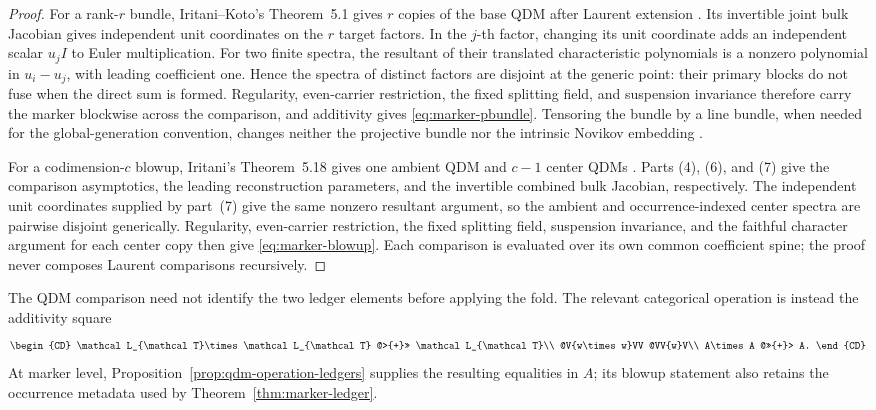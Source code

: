 \begin{proof}
For a rank-\(r\) bundle, Iritani--Koto's Theorem~5.1 gives \(r\) copies of
the base QDM after Laurent extension \cite[Theorem~5.1]{IritaniKoto}.  Its
invertible joint bulk Jacobian gives independent unit coordinates on the
\(r\) target factors.  In the \(j\)-th factor, changing its unit coordinate
adds an independent scalar \(u_jI\) to Euler multiplication.  For two finite
spectra, the resultant of their translated characteristic polynomials is a
nonzero polynomial in \(u_i-u_j\), with leading coefficient one.  Hence the
spectra of distinct factors are disjoint at the generic point: their primary
blocks do not fuse when the direct sum is formed.  Regularity, even-carrier
restriction, the fixed splitting field, and suspension invariance therefore carry the marker
blockwise across the comparison, and additivity gives
\eqref{eq:marker-pbundle}.  Tensoring the bundle by a line bundle, when needed
for the global-generation convention, changes neither the projective bundle
nor the intrinsic Novikov embedding
\cite[Remark~1.2 and Remark~5.2]{IritaniKoto}.

For a codimension-\(c\) blowup, Iritani's Theorem~5.18 gives one ambient QDM
and \(c-1\) center QDMs \cite[Theorem~5.18]{IritaniBlowup}.  Parts (4), (6),
and (7) give the comparison asymptotics, the leading reconstruction
parameters, and the invertible combined bulk Jacobian, respectively.  The
independent unit coordinates supplied by part~(7) give the same nonzero
resultant argument, so the ambient and occurrence-indexed center spectra are
pairwise disjoint generically.  Regularity, even-carrier restriction, the
fixed splitting field, suspension invariance, and the faithful character
argument for each center copy then give
\eqref{eq:marker-blowup}.  Each comparison is evaluated over its own common
coefficient spine; the proof never composes Laurent comparisons recursively.
\end{proof}

The QDM comparison need not identify the two ledger elements before applying
the fold.  The relevant categorical operation is instead the additivity square
\begin{equation}
\begin{CD}
 \mathcal L_{\mathcal T}\times\mathcal L_{\mathcal T}
 @>{+}>> \mathcal L_{\mathcal T}\\
 @V{w\times w}VV @VV{w}V\\
 A\times A @>>{+}> A.
\end{CD}
\label{diag:marker-fold-additivity}
\end{equation}
At marker level, Proposition~\ref{prop:qdm-operation-ledgers} supplies the
resulting equalities in \(A\); its blowup statement also retains the
occurrence metadata used by Theorem~\ref{thm:marker-ledger}.

